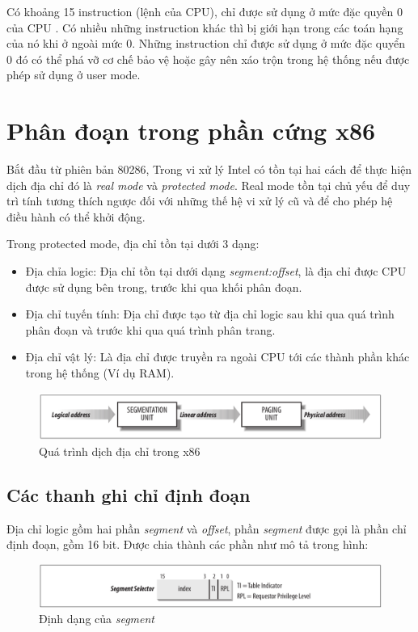 \documentclass[12pt]{report}
\begin{document}
Có khoảng 15 instruction (lệnh của CPU), chỉ được sử dụng ở mức đặc quyền 0 của CPU \cite{x86-rings}. Có nhiều những instruction khác thì bị giới hạn  trong các toán hạng của nó khi ở ngoài mức 0. Những instruction chỉ được sử dụng ở mức đặc quyển 0 đó có thể phá vỡ cơ chế bảo vệ hoặc gây nên xáo trộn trong hệ thống nếu được phép sử dụng ở user mode.

\section{Phân đoạn trong phần cứng x86}
Bắt đầu từ phiên bản 80286, Trong vi xử lý Intel có tồn tại hai cách để thực hiện dịch địa chỉ đó là \textit{real mode} và \textit{protected mode}. Real mode tồn tại chủ yếu để duy trì tính tương thích ngược đối với những thế hệ vi xử lý cũ và để cho phép hệ điều hành có thể khởi động. \cite{address_translation}

Trong protected mode, địa chỉ tồn tại dưới 3 dạng:
\begin{itemize}
\item Địa chỉa logic: Địa chỉ tồn tại dưới dạng \textit{segment:offset}, là địa chỉ được CPU được sử dụng bên trong, trước khi qua khối phân đoạn. 
\item Địa chỉ tuyến tính: Địa chỉ được tạo từ địa chỉ logic sau khi qua quá trình phân đoạn và trước khi qua quá trình phân trang. 
\item Địa chỉ vật lý: Là địa chỉ được truyền ra ngoài CPU tới các thành phần khác trong hệ thống (Ví dụ RAM).
\end{itemize}

\begin{figure}[h]
\centering
\caption{Quá trình dịch địa chỉ trong x86}
\includegraphics[width=\textwidth]{address_translation.png}
\end{figure}

\subsection{Các thanh ghi chỉ định đoạn}
Địa chỉ logic gồm hai phần \textit{segment} và \textit{offset}, phần \textit{segment} được gọi là phần chỉ định đoạn, gồm 16 bit. Được chia thành các phần như mô tả trong hình: 
\begin{figure}[h]
\centering
\caption{Định dạng của \textit{segment}}
\includegraphics[width=\textwidth]{segment_selector.png}
\end{figure}
\end{document}
